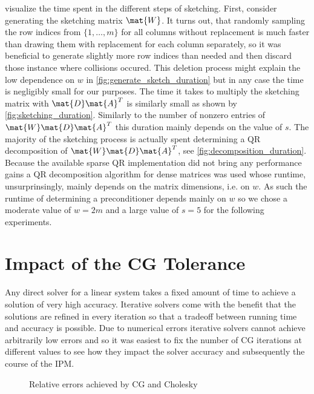  visualize the time spent in the different steps of sketching.
First, consider generating the sketching matrix \(\mat{W}\).
It turns out, that randomly sampling the row indices from \(\{1, \ldots, m\}\) for all columns without replacement is much faster than drawing them with replacement for each column separately, so it was beneficial to generate slightly more row indices than needed and then discard those instance where collisions occured.
This deletion process might explain the low dependence on \(w\) in \cref{fig:generate_sketch_duration} but in any case the time is negligibly small for our purposes.
The time it takes to multiply the sketching matrix with \(\mat{D}\mat{A}^T\) is similarly small as shown by \cref{fig:sketching_duration}.
Similarly to the number of nonzero entries of \(\mat{W}\mat{D}\mat{A}^T\) this duration mainly depends on the value of \(s\).
The majority of the sketching process is actually spent determining a QR decomposition of \(\mat{W}\mat{D}\mat{A}^T\), see \cref{fig:decomposition_duration}.
Because the available sparse QR implementation did not bring any performance gains a QR decomposition algorithm for dense matrices was used whose runtime, unsurprinsingly, mainly depends on the matrix dimensions, i.e. on \(w\).
As such the runtime of determining a preconditioner depends mainly on \(w\) so we chose a moderate value of \(w=2m\) and a large value of \(s=5\) for the following experiments.

\section{Impact of the CG Tolerance}

Any direct solver for a linear system takes a fixed amount of time to achieve a solution of very high accuracy.
Iterative solvers come with the benefit that the solutions are refined in every iteration so that a tradeoff between running time and accuracy is possible.
Due to numerical errors iterative solvers cannot achieve arbitrarily low errors and so it was easiest to fix the number of CG iterations at different values to see how they impact the solver accuracy and subsequently the course of the IPM.

\begin{figure}[tbp]
  \centering%
  \caption{Relative errors achieved by CG and Cholesky}%
  \label{fig:residual_norms}
\end{figure}

